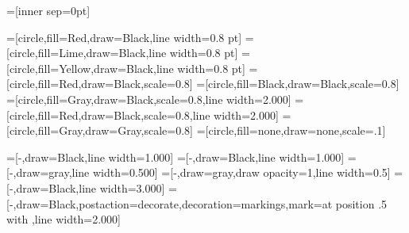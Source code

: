 

\usepackage[svgnames]{xcolor}
\usepackage{tikz}
\usetikzlibrary{decorations.markings}
\usetikzlibrary{shapes.geometric}

\newcommand\scaledLW{0.5} %

\newcommand\scaledNodeSize{0.5} %


=[inner sep=0pt]

=[circle,fill=Red,draw=Black,line width=0.8 pt]
=[circle,fill=Lime,draw=Black,line width=0.8 pt]
=[circle,fill=Yellow,draw=Black,line width=0.8 pt]
=[circle,fill=Red,draw=Black,scale=0.8]
=[circle,fill=Black,draw=Black,scale=0.8]
=[circle,fill=Gray,draw=Black,scale=0.8,line width=2.000]
=[circle,fill=Red,draw=Black,scale=0.8,line width=2.000]
=[circle,fill=Gray,draw=Gray,scale=0.8]
=[circle,fill=none,draw=none,scale=.1]




=[-,draw=Black,line width=1.000]
=[-,draw=Black,line width=1.000]
=[-,draw=gray,line width=0.500]
=[-,draw=gray,draw opacity=1,line width=0.5]
=[-,draw=Black,line width=3.000]
=[-,draw=Black,postaction={decorate},decoration={markings,mark=at position .5 with {\arrow{>}}},line width=2.000]


